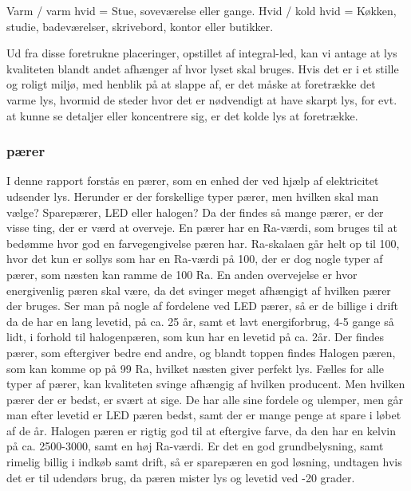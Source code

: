 Varm / varm hvid = Stue, soveværelse eller gange.
Hvid / kold hvid = Køkken, studie, badeværelser, skrivebord, kontor eller butikker\cite{varm_kold}.

Ud fra disse foretrukne placeringer, opstillet af integral-led, kan vi antage at lys kvaliteten blandt andet afhænger af hvor lyset skal bruges. Hvis det er i et stille og roligt miljø, med henblik på at slappe af, er det måske at foretrække det varme lys, hvormid de steder hvor det er nødvendigt at have skarpt lys, for evt. at kunne se detaljer eller koncentrere sig, er det kolde lys at foretrække.

\subsubsection{pærer}
I denne rapport forstås en pærer, som en enhed der ved hjælp af elektricitet udsender lys. Herunder er der forskellige typer pærer, men hvilken skal man vælge? Sparepærer, LED eller halogen?
Da der findes så mange pærer, er der visse ting, der er værd at overveje. En pærer har en Ra-værdi, som bruges til at bedømme hvor god en farvegengivelse pæren har. Ra-skalaen går helt op til 100, hvor det kun er sollys som har en Ra-værdi på 100, der er dog nogle typer af pærer, som næsten kan ramme de 100 Ra.\cite{halogen_paere}
\newline En anden overvejelse er hvor energivenlig pæren skal være, da det svinger meget afhængigt af hvilken pærer der bruges. Ser man på nogle af fordelene ved LED pærer, så er de billige i drift da de har en lang levetid, på ca. 25 år, samt et lavt energiforbrug\cite{LED}, 4-5 gange så lidt, i forhold til halogenpæren, som kun har en levetid på ca. 2år\cite{vaelg_paere}. 
Der findes pærer, som eftergiver bedre end andre, og blandt toppen findes Halogen pæren, som kan komme op på 99 Ra, hvilket næsten giver perfekt lys\cite{halogen_paere}. 
\newline Fælles for alle typer af pærer, kan kvaliteten svinge afhængig af hvilken producent. Men hvilken pærer der er bedst, er svært at sige. De har alle sine fordele og ulemper, men går man efter levetid er LED pæren bedst, samt der er mange penge at spare i løbet af de år. Halogen pæren er rigtig god til at eftergive farve, da den har en kelvin på ca. 2500-3000, samt en høj Ra-værdi. Er det en god grundbelysning, samt rimelig billig i indkøb samt drift, så er sparepæren en god løsning, undtagen hvis det er til udendørs brug, da pæren mister lys og levetid ved -20 grader\cite{sparepaerer}.

